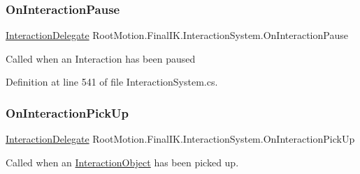 \mbox{\label{class_root_motion_1_1_final_i_k_1_1_interaction_system_a55b455594133b47497d458f36770e6f0}} 
\subsubsection{\texorpdfstring{On\+Interaction\+Pause}{OnInteractionPause}}
{\footnotesize\ttfamily \mbox{\hyperlink{class_root_motion_1_1_final_i_k_1_1_interaction_system_aa5a8c5136773b4244ab8f7ce707620b7}{Interaction\+Delegate}} Root\+Motion.\+Final\+I\+K.\+Interaction\+System.\+On\+Interaction\+Pause}



Called when an Interaction has been paused 



Definition at line 541 of file Interaction\+System.\+cs.

\mbox{\label{class_root_motion_1_1_final_i_k_1_1_interaction_system_a1f35ff50a703f8f82fa302ae8510593d}} 
\subsubsection{\texorpdfstring{On\+Interaction\+Pick\+Up}{OnInteractionPickUp}}
{\footnotesize\ttfamily \mbox{\hyperlink{class_root_motion_1_1_final_i_k_1_1_interaction_system_aa5a8c5136773b4244ab8f7ce707620b7}{Interaction\+Delegate}} Root\+Motion.\+Final\+I\+K.\+Interaction\+System.\+On\+Interaction\+Pick\+Up}



Called when an \mbox{\hyperlink{class_root_motion_1_1_final_i_k_1_1_interaction_object}{Interaction\+Object}} has been picked up. 



